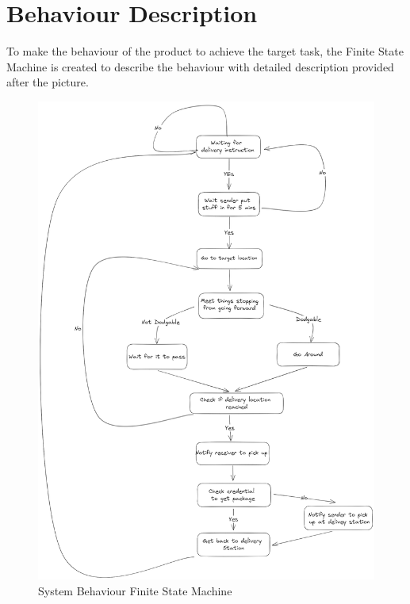 \documentclass[12pt]{article}
\begin{document}
\section{Behaviour Description}
To make the behaviour of the product to achieve the target task, the Finite State Machine is created to describe the behaviour with detailed description provided after the picture.
\begin{figure}[H]
    \centering
    \includegraphics[width=\textwidth,height=\textheight,keepaspectratio]{../state-machine.png}
    \caption{System Behaviour Finite State Machine}
\end{figure}
\end{document}
